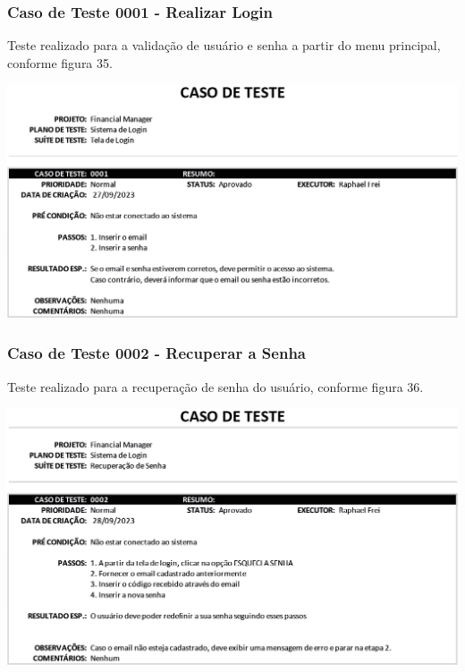 \subsubsection{Caso de Teste 0001 - Realizar Login}

Teste realizado para a validação de usuário e senha a partir do menu principal, conforme figura 35.

    \begin{center}
        \begin{minipage}{\textwidth}
            \centering
            \includegraphics[scale=0.8]{figs/caso-testes-0001.png}
            \label{fig:figura35}
        \end{minipage}
    \end{center} 

\subsubsection{Caso de Teste 0002 - Recuperar a Senha}

Teste realizado para a recuperação de senha do usuário, conforme figura 36.

    \begin{center}
        \begin{minipage}{\textwidth}
            \centering
            \includegraphics[scale=0.8]{figs/caso-testes-0002.png}
            \label{fig:figura36}
        \end{minipage}
    \end{center} 


